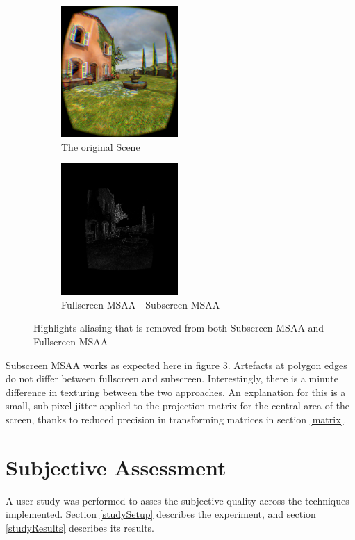 \documentclass[12pt,a4paper,twoside,openright]{report}
\begin{document}
\begin{figure}[tbh]

\begin{subfigure}{0.5\textwidth}
\includegraphics[width=0.9\linewidth, height=5cm]{figs/noantialiasing.png}
\caption{The original Scene}
\label{fig:subim2}
\end{subfigure}
\begin{subfigure}{0.5\textwidth}
\includegraphics[width=0.9\linewidth, height=5cm]{figs/fullscreenminussubscreenmsaa.png} 
\caption{Fullscreen MSAA - Subscreen MSAA}
\label{fig:subim1}
\end{subfigure}
 
\caption{Highlights aliasing that is removed from both Subscreen MSAA and Fullscreen MSAA}
\label{fig:multisample}
\end{figure}

Subscreen MSAA works as expected here in figure \ref{fig:multisample}. Artefacts at polygon edges do not differ between fullscreen and subscreen. Interestingly, there is a minute difference in texturing between the two approaches. An explanation for this is a small, sub-pixel jitter applied to the projection matrix for the central area of the screen, thanks to reduced precision in transforming matrices in section \ref{matrix}.

\section{Subjective Assessment}
A user study was performed to asses the subjective quality across the techniques implemented. Section \ref{studySetup} describes the experiment, and section \ref{studyResults} describes its results.
\end{document}
